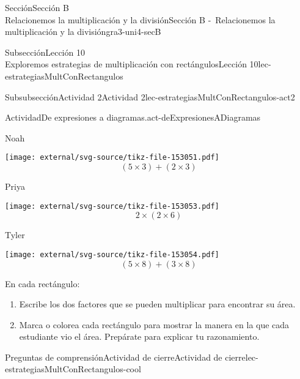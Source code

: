 \begin{sectionptx}{Sección}{{\Large Sección B\\}Relacionemos la multiplicación y la división}{}{Sección B -~Relacionemos la multiplicación y la división}{}{}{gra3-uni4-secB}
\begin{subsectionptx}{Subsección}{{\normalsize Lección 10\\[-0.05cm]}Exploremos estrategias de multiplicación con rectángulos}{}{Lección 10}{}{}{lec-estrategiasMultConRectangulos}
%
\begin{subsubsectionptx}{Subsubsección}{Actividad 2}{}{Actividad 2}{}{}{lec-estrategiasMultConRectangulos-act2}
\begin{activity}{Actividad}{De expresiones a diagramas.}{act-deExpresionesADiagramas}%
\begin{sidebyside}{3}{0.0166666666666667}{0.0166666666666667}{0.0333333333333333}%
\begin{sbspanel}{0.3}%
Noah%
\par
\texttt{[image: external/svg-source/tikz-file-153051.pdf]}
%
\begin{equation*}
(5\times 3)+(2 \times 3)
\end{equation*}
%
\end{sbspanel}%
\begin{sbspanel}{0.3}%
Priya%
\par
\texttt{[image: external/svg-source/tikz-file-153053.pdf]}
%
\begin{equation*}
2 \times (2 \times 6)
\end{equation*}
%
\end{sbspanel}%
\begin{sbspanel}{0.3}%
Tyler%
\par
\texttt{[image: external/svg-source/tikz-file-153054.pdf]}
%
\begin{equation*}
(5 \times 8) + (3 \times 8)
\end{equation*}
%
\end{sbspanel}%
\end{sidebyside}%
\par
\vspace*{-2ex}
En cada rectángulo:%
%
\begin{enumerate}
\item{}Escribe los dos factores que se pueden multiplicar para encontrar su área.%
\item{}Marca o colorea cada rectángulo para mostrar la manera en la que cada estudiante vio el área. Prepárate para explicar tu razonamiento.%
\end{enumerate}
\end{activity}%
\end{subsubsectionptx}
%
%
\typeout{************************************************}
\typeout{************************************************}
%
\begin{reading-questions-subsubsection}{Preguntas de comprensión}{Actividad de cierre}{}{Actividad de cierre}{}{}{lec-estrategiasMultConRectangulos-cool}

\end{reading-questions-subsubsection}
\end{subsectionptx}
\end{sectionptx}
